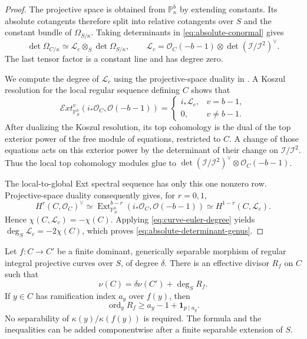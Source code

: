 \begin{proof}
The projective space is obtained from $\mathbb P^b_\kappa$ by extending
constants.  Its absolute cotangents therefore split into relative
cotangents over $S$ and the constant bundle of $\Omega_{S/\kappa}$.
Taking determinants in \eqref{eq:absolute-conormal} gives
\[
 \det\Omega_{C/\kappa}
  \simeq\mathcal L_c\otimes_S\det\Omega_{S/\kappa},
 \qquad
 \mathcal L_c=
 \mathcal O_C(-b-1)\otimes
       \det(\mathcal I/\mathcal I^2)^\vee.
\]
The last tensor factor is a constant line and has degree zero.

We compute the degree of $\mathcal L_c$ using the
projective-space duality in .
A Koszul resolution for the local regular sequence defining $C$ shows
that
\[
 \mathcal E xt^v_{\mathbb P^b_S}
       (i_*\mathcal O_C,\mathcal O(-b-1))
 =\begin{cases}
   i_*\mathcal L_c,&v=b-1,\\
   0,&v\ne b-1.
  \end{cases}
\]
After dualizing the Koszul resolution, its top cohomology
is the dual of the top exterior power of the free module of equations,
restricted to $C$.  A change of those equations acts on this exterior
power by the determinant of their change on $\mathcal I/\mathcal I^2$.
Thus the local top cohomology modules glue to
$\det(\mathcal I/\mathcal I^2)^\vee\otimes\mathcal O_C(-b-1)$.

The local-to-global Ext spectral sequence has only this one nonzero
row.  Projective-space duality consequently gives, for $r=0,1$,
\[
 H^r(C,\mathcal O_C)^\vee
  \simeq
 \operatorname{Ext}^{b-r}_{\mathbb P^b_S}
       (i_*\mathcal O_C,\mathcal O(-b-1))
  \simeq H^{1-r}(C,\mathcal L_c).
\]
Hence $\chi(C,\mathcal L_c)=-\chi(C)$.  Applying
\eqref{eq:curve-euler-degree} yields
$\deg_S\mathcal L_c=-2\chi(C)$, which proves
\eqref{eq:absolute-determinant-genus}.
\end{proof}

\begin{lemma}
\label{lem:separable-different}
Let $f:C\to C'$ be a finite dominant, generically separable morphism of
regular integral projective curves over $S$, of degree $\delta$.
There is an effective divisor $R_f$ on $C$ such that
\[
 \nu(C)=\delta\nu(C')+\deg_S R_f.
\]
If $y\in C$ has ramification index $a_y$ over $f(y)$, then
\begin{equation}
 \operatorname{ord}_y R_f\ge a_y-1+\mathbf 1_{p\mid a_y}.
 \label{eq:separable-different-bound}
\end{equation}
No separability of $\kappa(y)/\kappa(f(y))$ is required.
The formula and the inequalities can be added componentwise after a
finite separable extension of $S$.
\end{lemma}

